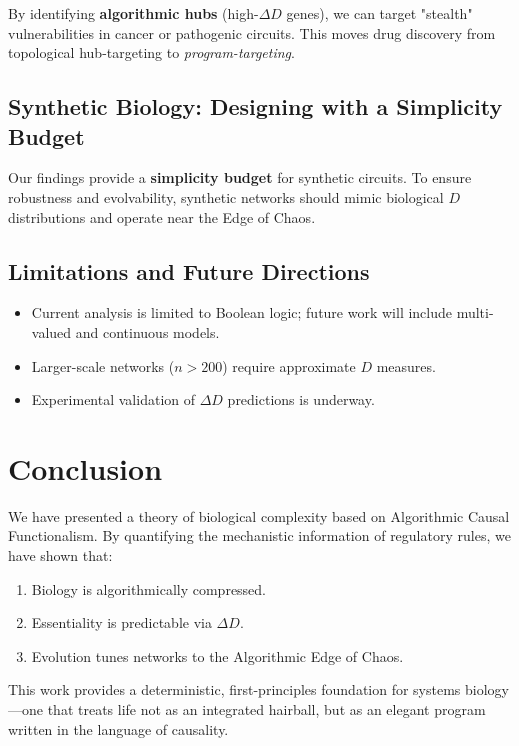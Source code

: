 \documentclass[10pt, twocolumn]{article}
\begin{document}
By identifying \textbf{algorithmic hubs} (high-$\Delta D$ genes), we can target "stealth" vulnerabilities in cancer or pathogenic circuits. This moves drug discovery from topological hub-targeting to \textit{program-targeting}.

\subsection{Synthetic Biology: Designing with a Simplicity Budget}

Our findings provide a \textbf{simplicity budget} for synthetic circuits. To ensure robustness and evolvability, synthetic networks should mimic biological $D$ distributions and operate near the Edge of Chaos.

\subsection{Limitations and Future Directions}

\begin{itemize}
    \item Current analysis is limited to Boolean logic; future work will include multi-valued and continuous models.
    \item Larger-scale networks ($n > 200$) require approximate $D$ measures.
    \item Experimental validation of $\Delta D$ predictions is underway.
\end{itemize}

\section{Conclusion}

We have presented a theory of biological complexity based on Algorithmic Causal Functionalism. By quantifying the mechanistic information of regulatory rules, we have shown that:
\begin{enumerate}
    \item Biology is algorithmically compressed.
    \item Essentiality is predictable via $\Delta D$.
    \item Evolution tunes networks to the Algorithmic Edge of Chaos.
\end{enumerate}

This work provides a deterministic, first-principles foundation for systems biology—one that treats life not as an integrated hairball, but as an elegant program written in the language of causality.
\end{document}
